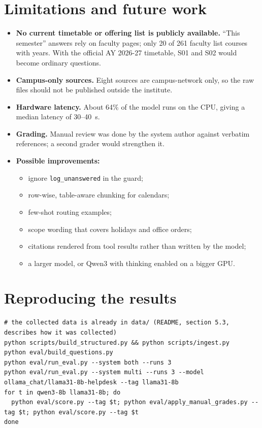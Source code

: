 \documentclass[11pt,a4paper]{article}
\newcommand{\code}[1]{\texttt{#1}}
\begin{document}
\section{Limitations and future work}
\begin{itemize}
  \item \textbf{No current timetable or offering list is publicly available.} ``This semester'' answers rely on
        faculty pages; only 20 of 261 faculty list courses with years. With the official AY 2026-27 timetable,
        S01 and S02 would become ordinary questions.
  \item \textbf{Campus-only sources.} Eight sources are campus-network only, so the raw files should not be published
        outside the institute.
  \item \textbf{Hardware latency.} About 64\% of the model runs on the CPU, giving a median latency of 30--40~s.
  \item \textbf{Grading.} Manual review was done by the system author against verbatim references; a second grader
        would strengthen it.
  \item \textbf{Possible improvements:}
    \begin{itemize}
      \item ignore \code{log\_unanswered} in the guard;
      \item row-wise, table-aware chunking for calendars;
      \item few-shot routing examples;
      \item scope wording that covers holidays and office orders;
      \item citations rendered from tool results rather than written by the model;
      \item a larger model, or Qwen3 with thinking enabled on a bigger GPU.
    \end{itemize}
\end{itemize}

\section{Reproducing the results}
\begin{lstlisting}
# the collected data is already in data/ (README, section 5.3, describes how it was collected)
python scripts/build_structured.py && python scripts/ingest.py
python eval/build_questions.py
python eval/run_eval.py --system both --runs 3
python eval/run_eval.py --system multi --runs 3 --model ollama_chat/llama31-8b-helpdesk --tag llama31-8b
for t in qwen3-8b llama31-8b; do
  python eval/score.py --tag $t; python eval/apply_manual_grades.py --tag $t; python eval/score.py --tag $t
done
\end{lstlisting}
\end{document}
